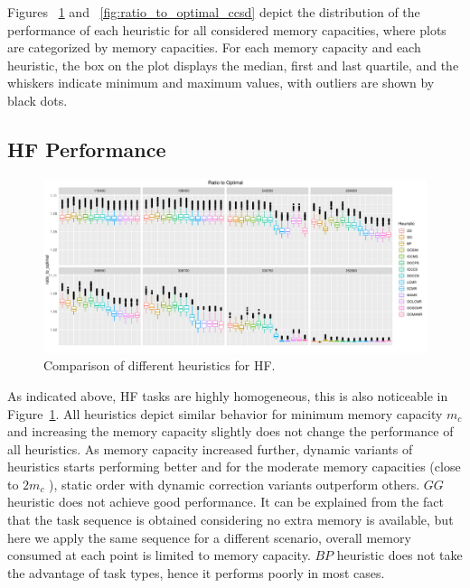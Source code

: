 \documentclass[sigconf]{acmart}
\begin{document}
{		
		Figures ~\ref{fig:ratio_to_optimal_hf} and ~\ref{fig:ratio_to_optimal_ccsd} depict the distribution of the performance of each heuristic for all considered memory capacities, where plots are categorized by memory capacities. For each memory capacity and each heuristic, the box on the plot displays the median, first and last quartile, and the whiskers indicate minimum and maximum values, with outliers are shown by black dots.
		\subsection{HF Performance}	
		\begin{figure}[htb]
			\includegraphics[scale=0.5]{./all-binpack/ratio_to_optimal_selected_hf.pdf}
			\caption{Comparison of different heuristics for HF.}
			\label{fig:ratio_to_optimal_hf}
		\end{figure}
		As indicated above, HF tasks are highly homogeneous, this is also noticeable in Figure~\ref{fig:ratio_to_optimal_hf}. All heuristics depict similar behavior for minimum memory capacity $m_c$ and increasing the memory capacity slightly does not change the performance of all heuristics. As memory capacity increased further, dynamic variants of heuristics starts performing better and for the moderate memory capacities (close to $2m_c$ ), static order with dynamic correction variants outperform others. $GG$ heuristic does not achieve good performance. It can be explained from the fact that the task sequence is obtained considering no extra memory is available, but here we apply the same sequence for a different scenario, overall memory consumed at each point is limited to memory capacity. $BP$ heuristic does not take the advantage of task types, hence it performs poorly in most cases.
		
}
\end{document}
